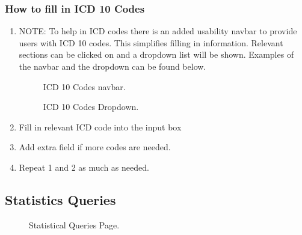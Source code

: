 \documentclass[14pt, a4paper]{article}
\begin{document}
	\subsubsection{How to fill in ICD 10 Codes}
		\begin{enumerate}
			\item NOTE: To help in ICD codes there is an added usability navbar to provide users with ICD 10 codes. This simplifies filling in information. Relevant sections can be clicked on and a dropdown list will be shown. Examples of the navbar and the dropdown can be found below.
			\begin{figure}[H]
				\centerline{}
				\caption{ICD 10 Codes navbar.}
				\label{fig:forms2}
			\end{figure}
			\begin{figure}[H]
				\centerline{}
				\caption{ICD 10 Codes Dropdown.}
				\label{fig:forms3}
			\end{figure}
			\item Fill in relevant ICD code into the input box
			\item Add extra field if more codes are needed.
			\item Repeat 1 and 2 as much as needed.
		\end{enumerate}
\subsection{Statistics Queries}
	\begin{figure}[H]
		\centerline{}
		\caption{Statistical Queries Page.}
		\label{fig:statsQ1}
	\end{figure}
\end{document}
